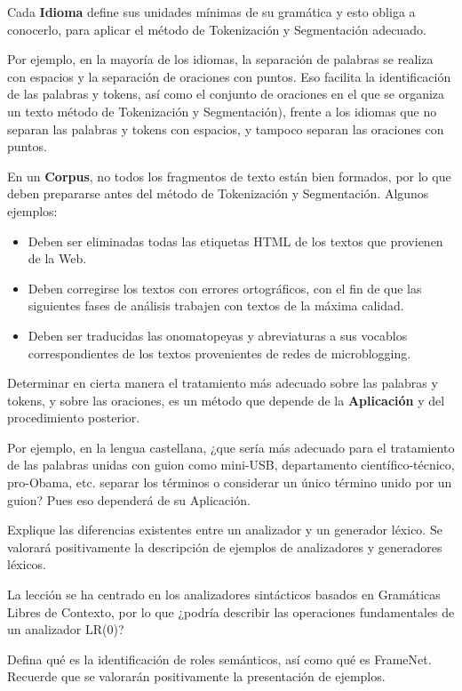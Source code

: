 \documentclass{exam}
\begin{document}
\begin{questions}
Cada {\bf Idioma} define sus unidades mínimas de su gramática y esto obliga a conocerlo, para aplicar el método de Tokenización y Segmentación adecuado.

Por ejemplo, en la mayoría de los idiomas, la separación de palabras se realiza con espacios y la separación de oraciones con puntos. Eso facilita la identificación de las palabras y tokens, así como el conjunto de oraciones en el que se organiza un texto método de Tokenización y Segmentación), frente a los idiomas que no separan las palabras y tokens con espacios, y tampoco separan las oraciones con puntos.

En un {\bf Corpus}, no todos los fragmentos de texto están bien formados, por lo que deben prepararse antes del método de Tokenización y Segmentación. Algunos ejemplos:

\begin{itemize}
	\item Deben ser	eliminadas todas las etiquetas HTML de los textos que provienen de la Web.
	\item Deben corregirse los textos con errores ortográficos, con el fin de que las siguientes fases de análisis trabajen con textos de la máxima calidad.
	\item Deben ser traducidas las onomatopeyas y abreviaturas a sus vocablos correspondientes de los textos provenientes de redes de microblogging. 
\end{itemize}

Determinar en cierta manera el tratamiento más adecuado sobre las palabras y tokens, y sobre las oraciones, es un método que depende de la {\bf Aplicación} y del procedimiento posterior.

Por ejemplo, en la lengua castellana, ¿que sería más adecuado para el tratamiento de las palabras unidas con guion como mini-USB, departamento científico-técnico, pro-Obama, etc. separar los términos o considerar un único término unido por un guion? Pues eso dependerá de su Aplicación.

\question Explique las diferencias existentes entre un analizador y un generador léxico. Se valorará positivamente la descripción de ejemplos de analizadores y generadores léxicos. 

\question La lección se ha centrado en los analizadores sintácticos basados en Gramáticas Libres de Contexto, por lo que ¿podría describir las operaciones fundamentales de un analizador LR(0)?

\question Defina qué es la identificación de roles semánticos, así como qué es FrameNet. Recuerde que se valorarán positivamente la presentación de ejemplos.

\end{questions}
\end{document}
